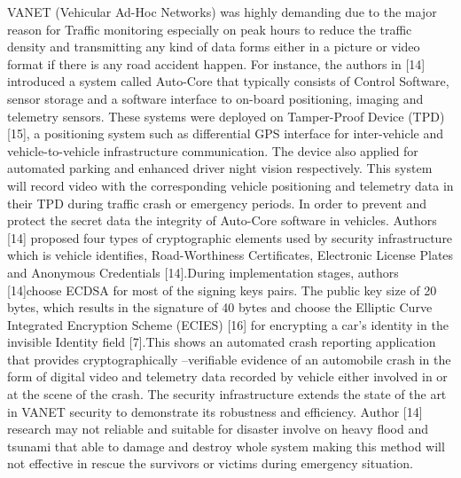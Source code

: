 \documentclass{article}
\begin{document}
VANET (Vehicular Ad-Hoc Networks) was highly demanding due to the major reason for Traffic monitoring especially on peak hours to reduce the traffic density and transmitting any kind of data forms either in a picture or video format if there is any road accident happen. For instance, the authors in [14] introduced a system called Auto-Core that typically consists of Control Software, sensor storage and a software interface to on-board positioning, imaging and telemetry sensors. These systems were deployed on Tamper-Proof Device (TPD) [15], a positioning system such as differential GPS interface for inter-vehicle and vehicle-to-vehicle infrastructure communication. The device also applied for automated parking and enhanced driver night vision respectively. This system will record video with the corresponding vehicle positioning and telemetry data in their TPD during traffic crash or emergency periods. In order to prevent and protect the secret data the integrity of Auto-Core software in vehicles. Authors [14] proposed four types of cryptographic elements used by security infrastructure which is vehicle identifies, Road-Worthiness Certificates, Electronic License Plates and Anonymous Credentials [14].During implementation stages, authors [14]choose ECDSA for most of the signing keys pairs. The public key size of 20 bytes, which results in the signature of 40 bytes and choose the Elliptic Curve Integrated Encryption Scheme (ECIES) [16] for encrypting a car’s identity in the invisible Identity field [7].This shows an automated crash reporting application that provides cryptographically –verifiable evidence of an automobile crash in the form of digital video and telemetry data recorded by vehicle either involved in or at the scene of the crash. The security infrastructure extends the state of the art in VANET security to demonstrate its robustness and efficiency. Author [14] research may not reliable and suitable for disaster involve on heavy flood and tsunami that able to damage and destroy whole system making this method will not effective in rescue the survivors or victims during emergency  situation.
\end{document}
